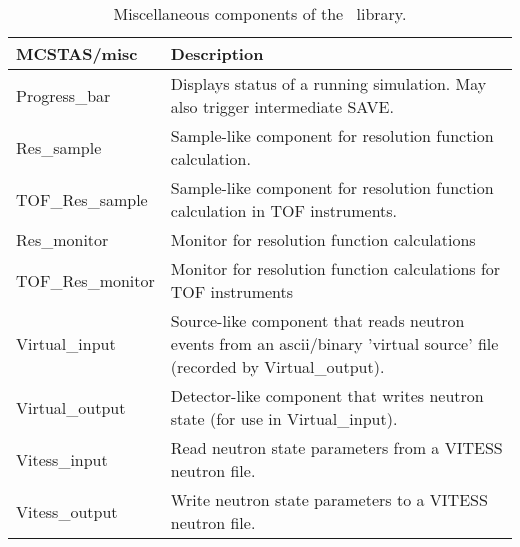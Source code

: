 \begin{table}
  \begin{center}
    {\let\my=\\
    \begin{tabular}{|p{}|p{}|}
      \hline
       {\bf MCSTAS/misc} & Description \\
       \hline
 Progress\_bar     &  Displays status of a running simulation. 
                      May also trigger intermediate SAVE.\\
  Res\_sample   & Sample-like component for resolution function calculation. \\
  TOF\_Res\_sample   & Sample-like component for resolution function calculation in TOF instruments. \\
Res\_monitor      &   Monitor for resolution function calculations \\
TOF\_Res\_monitor      &   Monitor for resolution function calculations
                        for TOF instruments \\
Virtual\_input &  Source-like component that reads neutron events 
                  from an ascii/binary 'virtual source' file (recorded by Virtual\_output). \\
Virtual\_output &  Detector-like component that writes neutron state 
                   (for use in Virtual\_input). \\
 Vitess\_input     &   Read neutron state parameters from a VITESS neutron file.\\
 Vitess\_output    &  Write neutron state parameters to a VITESS neutron file.\\
      \hline
    \end{tabular}
    \caption{Miscellaneous components of the \MCS\ library.}
    \label{t:comp-misc}
    }
  \end{center}
\end{table}

